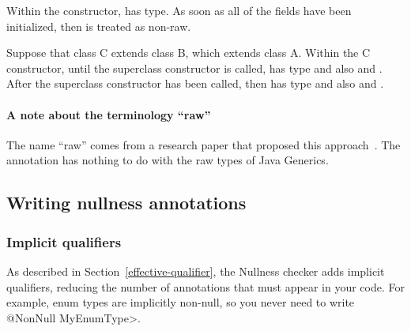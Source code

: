 Within the constructor,
 has  type.
As soon as all of the  fields
have been initialized, then  is treated as non-raw.


Suppose that class C extends class B, which extends class A.  Within the C
constructor, until the superclass constructor is called,  has
type  and also  and .  After the
superclass constructor has been called, then  has type
 and also  and .



\paragraph{A note about the terminology ``raw''}

The name ``raw'' comes from a research paper that proposed this
approach~\cite{FahndrichL2003}.  The 
annotation has nothing to do with the raw types of Java Generics.



\subsection{Writing nullness annotations\label{writing-nullness-annotations}}

\subsubsection{Implicit qualifiers\label{nullness-implicit-qualifiers}}

As described in Section~\ref{effective-qualifier}, the Nullness checker
adds implicit qualifiers, reducing the number of annotations that must
appear in your code.
For example, enum types are implicitly non-null, so you never need to write
\<@NonNull MyEnumType>.

